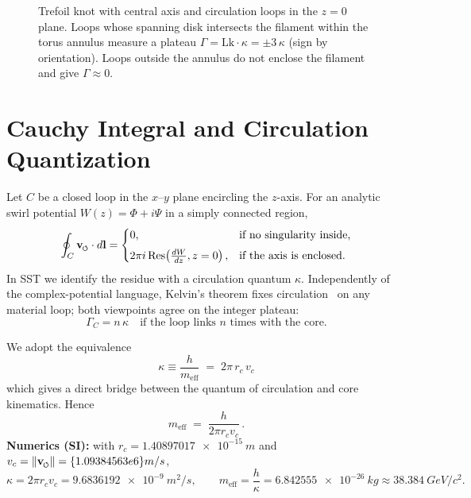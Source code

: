 \documentclass[reprint,aps,onecolumn,nofootinbib]{revtex4-2}
\newcommand{\swirlarrow}{%
    \mathchoice{\mkern-2mu\scriptstyle\boldsymbol{\circlearrowleft}}%
    {\mkern-2mu\scriptstyle\boldsymbol{\circlearrowleft}}%
    {\mkern-2mu\scriptscriptstyle\boldsymbol{\circlearrowleft}}%
    {\mkern-2mu\scriptscriptstyle\boldsymbol{\circlearrowleft}}%
}
\newcommand{\vswirl}{\mathbf{v}_{\swirlarrow}}
\begin{document}
\begin{figure}[htbp]
        \caption{Trefoil knot with central axis and circulation loops in the \(z{=}0\) plane.
        Loops whose spanning disk intersects the filament within the torus annulus measure a plateau \(\Gamma=\mathrm{Lk}\cdot\kappa=\pm 3\,\kappa\) (sign by orientation).
        Loops outside the annulus do not enclose the filament and give \(\Gamma\approx 0\).}
        \label{fig:trefoil_axis_plateau_clean}
    \end{figure}


\section{Cauchy Integral and Circulation Quantization}
    Let $C$ be a closed loop in the $x$–$y$ plane encircling the $z$-axis. For an analytic swirl potential $W(z)=\Phi+i\Psi$ in a simply connected region,
    \begin{equation}
        \oint_C \vswirl \cdot d\mathbf{l} =
        \begin{cases}
            0, & \text{if no singularity inside,}\\[4pt]
            2\pi i\, \mathrm{Res}\!\left(\frac{dW}{dz}, z=0\right), & \text{if the axis is enclosed.}
        \end{cases}\label{eq:cauchy-circulation}
    \end{equation}
    In SST we identify the residue with a circulation quantum $\kappa$. Independently of the complex-potential language, Kelvin’s theorem fixes circulation~\cite{helmholtz1858,kelvin1869,Saffman1992,MajdaBertozzi2002} on any material loop; both viewpoints agree on the integer plateau:
    \begin{equation}
        \Gamma_C = n\,\kappa \quad \text{if the loop links $n$ times with the core.}
        \label{eq:circulation-quantization}
    \end{equation}

    \begin{tcolorbox}[title=\textbf{Canonical identification of $\kappa$ (SST)}]
        We adopt the equivalence
        \[
            \boxed{\;\kappa \equiv \frac{h}{m_{\text{eff}}} \;=\; 2\pi\, r_c\, v_c\;}
        \]
        which gives a direct bridge between the quantum of circulation and core kinematics. Hence
        \[
            m_{\text{eff}} \;=\; \frac{h}{2\pi r_c v_c}\,.
        \]
        \textbf{Numerics (SI):} with $r_c=\qty{1.40897017e-15}{m}$ and $v_c=\lVert \mathbf{v}_{\swirlarrow}\rVert=\qty{1.09384563e6}{m/s}$,
        \[
            \kappa=2\pi r_c v_c=\qty{9.6836192e-9}{m^2/s},\qquad
            m_{\text{eff}}=\frac{h}{\kappa}=\qty{6.842555e-26}{kg}\approx\qty{38.384}{GeV/c^2}.
        \]
    \end{tcolorbox}
\end{document}
